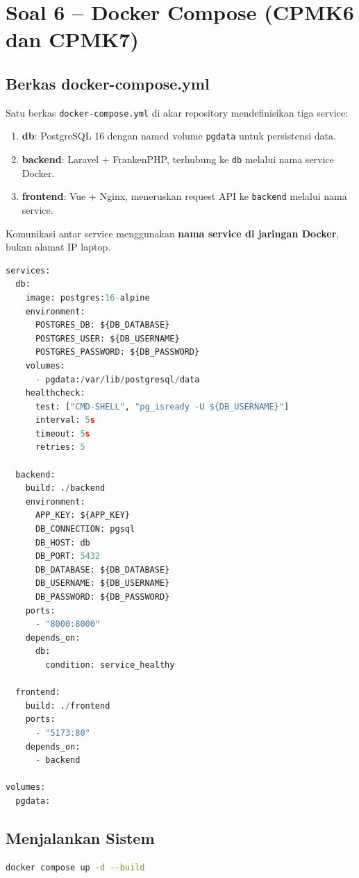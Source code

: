 \documentclass[12pt,letterpaper]{report}
\begin{document}
\section{Soal 6 -- Docker Compose (CPMK6 dan CPMK7)}

\subsection{Berkas docker-compose.yml}
Satu berkas \texttt{docker-compose.yml} di akar repository mendefinisikan tiga service:

\begin{enumerate}[label=\alph*.]
    \item \textbf{db}: PostgreSQL 16 dengan named volume \texttt{pgdata} untuk persistensi data.
    \item \textbf{backend}: Laravel + FrankenPHP, terhubung ke \texttt{db} melalui nama service Docker.
    \item \textbf{frontend}: Vue + Nginx, meneruskan request API ke \texttt{backend} melalui nama service.
\end{enumerate}

Komunikasi antar service menggunakan \textbf{nama service di jaringan Docker}, bukan alamat IP laptop.

\begin{lstlisting}[language=python]
services:
  db:
    image: postgres:16-alpine
    environment:
      POSTGRES_DB: ${DB_DATABASE}
      POSTGRES_USER: ${DB_USERNAME}
      POSTGRES_PASSWORD: ${DB_PASSWORD}
    volumes:
      - pgdata:/var/lib/postgresql/data
    healthcheck:
      test: ["CMD-SHELL", "pg_isready -U ${DB_USERNAME}"]
      interval: 5s
      timeout: 5s
      retries: 5

  backend:
    build: ./backend
    environment:
      APP_KEY: ${APP_KEY}
      DB_CONNECTION: pgsql
      DB_HOST: db
      DB_PORT: 5432
      DB_DATABASE: ${DB_DATABASE}
      DB_USERNAME: ${DB_USERNAME}
      DB_PASSWORD: ${DB_PASSWORD}
    ports:
      - "8000:8000"
    depends_on:
      db:
        condition: service_healthy

  frontend:
    build: ./frontend
    ports:
      - "5173:80"
    depends_on:
      - backend

volumes:
  pgdata:
\end{lstlisting}

\subsection{Menjalankan Sistem}
\begin{lstlisting}[language=bash]
docker compose up -d --build
\end{lstlisting}
\end{document}
